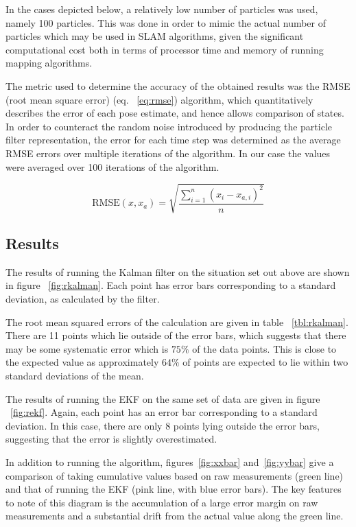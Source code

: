 \documentclass[english]{article}
\begin{document}
In the cases depicted below, a relatively low number of particles was used, namely 100 particles. This was done in order to mimic the actual number of particles which may be used in SLAM algorithms, given the significant computational cost both in terms of processor time and memory of running mapping algorithms.

The metric used to determine the accuracy of the obtained results was the RMSE (root mean square error) (eq. ~\ref{eq:rmse}) algorithm, which quantitatively describes the error of each pose estimate, and hence allows comparison of states. In order to counteract the random noise introduced by producing the particle filter representation, the error for each time step was determined as the average RMSE errors over multiple iterations of the algorithm. In our case the values were averaged over 100 iterations of the algorithm.

\begin{equation}
\label{eq:rmse}
\mathrm{RMSE}(x, x_a) = \sqrt{\frac{\sum^n_{i=1} \left(x_i - x_{a,i}\right)^2}{n}}
\end{equation}


\subsection{Results}
The results of running the Kalman filter on the situation set out above are shown in figure ~\ref{fig:rkalman}. Each point has error bars corresponding to a standard deviation, as calculated by the filter.

The root mean squared errors of the calculation are given in table ~\ref{tbl:rkalman}. There are 11 points which lie outside of the error bars, which suggests that there may be some systematic error which is $75\%$ of the data points. This is close to the expected value as approximately $64\%$ of points are expected to lie within two standard deviations of the mean.

The results of running the EKF on the same set of data are given in figure ~\ref{fig:rekf}. Again, each point has an error bar corresponding to a standard deviation. In this case, there are only $8$ points lying outside the error bars, suggesting that the error is slightly overestimated.

In addition to running the algorithm, figures~\ref{fig:xxbar} and~\ref{fig:yybar} give a comparison of taking cumulative values based on raw measurements (green line) and that of running the EKF (pink line, with blue error bars). The key features to note of this diagram is the accumulation of a large error margin on raw measurements and a substantial drift from the actual value along the green line.
\end{document}
